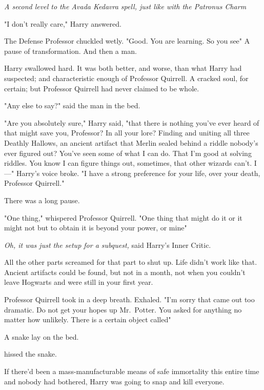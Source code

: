 \emph{A second level to the Avada Kedavra spell, just like with the Patronus
Charm{\el}}

"I don't really care," Harry answered.

The Defense Professor chuckled wetly. "Good. You are{\el} learning. So you
see{\el}" A pause of transformation.  And then a man.

Harry swallowed hard. It was both better, and worse, than what Harry had
suspected; and characteristic enough of Professor Quirrell. A cracked soul, for
certain; but Professor Quirrell had never claimed to be whole.

"Any else{\el} to say?" said the man in the bed.

"Are you absolutely sure," Harry said, "that there is nothing you've ever heard
of that might save you, Professor? In all your lore? Finding and uniting all
three Deathly Hallows, an ancient artifact that Merlin sealed behind a riddle
nobody's ever figured out? You've seen some of what I can do. That I'm good at
solving riddles. You know I can figure things out, sometimes, that other
wizards can't. I---" Harry's voice broke. "I have a strong preference for your
life, over your death, Professor Quirrell."

There was a long pause.

"One thing," whispered Professor Quirrell. "One thing{\el} that might do
it{\el} or it might not{\el} but to obtain it{\el} is beyond your
power, or mine{\el}"

\emph{Oh, it was just the setup for a subquest,} said Harry's Inner Critic.

All the other parts screamed for that part to shut up. Life didn't work like
that. Ancient artifacts could be found, but not in a month, not when you
couldn't leave Hogwarts and were still in your first year.

Professor Quirrell took in a deep breath. Exhaled. "I'm sorry{\el} that came
out{\el} too dramatic. Do not{\el} get your hopes up{\el} Mr.~Potter.
You asked{\el} for anything{\el} no matter how unlikely. There is{\el}
a certain object{\el} called{\el}"

A snake lay on the bed.

 hissed the snake.

If there'd been a mass-manufacturable means of safe immortality this entire
time and nobody had bothered, Harry was going to snap and kill everyone.

